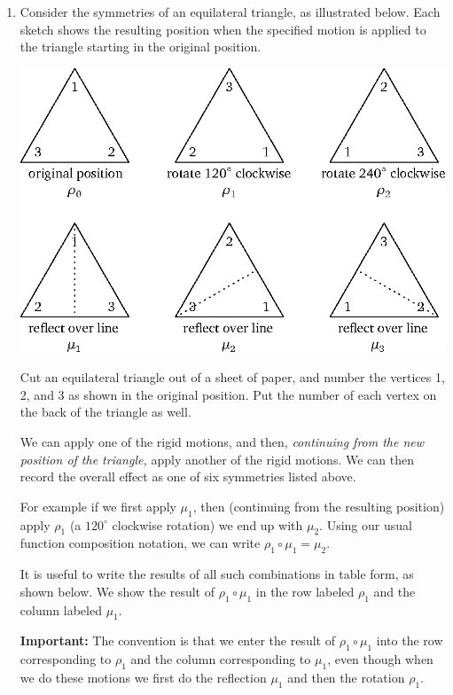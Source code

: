 \begin{enumerate}
    \item Consider the symmetries of an equilateral triangle, as illustrated below. Each sketch shows the resulting position when the specified motion is applied to the triangle starting in the original position.
\begin{center}
    \includegraphics{wstriangles.eps}
\end{center}
    Cut an equilateral triangle out of a sheet of paper, and number the vertices 1, 2, and 3 as shown in the original position. Put the number of each vertex on the back of the triangle as well.

    We can apply one of the rigid motions, and then, \textit{continuing from the new position of the triangle,} apply another of the rigid motions. We can then record the overall effect as one of six symmetries listed above.

    For example if we first apply $\mu_1$, then (continuing from the resulting position) apply $\rho_1$ (a $120^\circ$ clockwise rotation) we end up with $\mu_2$. Using our usual function composition notation, we can write $\rho_1 \circ \mu_1 = \mu_2$.

    It is useful to write the results of all such combinations in table form, as shown below. We show the result of $\rho_1 \circ \mu_1$ in the row labeled $\rho_1$ and the column labeled $\mu_1$.

    \textbf{Important:} The convention is that we enter the result of $\rho_1 \circ \mu_1$ into the row corresponding to $\rho_1$ and the column corresponding to $\mu_1$, even though when we do these motions we first do the reflection $\mu_1$ and then the rotation $\rho_1$.


\end{enumerate}
